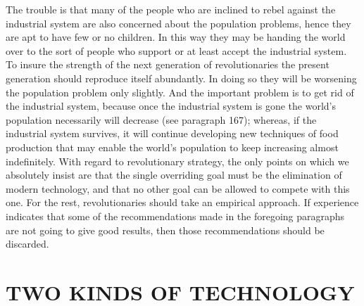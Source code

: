  The trouble is that many of the people who are inclined to rebel against the industrial system are also concerned about the population problems, hence they are apt to have few or no children. In this way they may be handing the world over to the sort of people who support or at least accept the industrial system. To insure the strength of the next generation of revolutionaries the present generation should reproduce itself abundantly. In doing so they will be worsening the population problem only slightly. And the important problem is to get rid of the industrial system, because once the industrial system is gone the world’s population necessarily will decrease (see paragraph 167); whereas, if the industrial system survives, it will continue developing new techniques of food production that may enable the world’s population to keep increasing almost indefinitely.\break
{} With regard to revolutionary strategy, the only points on which we absolutely insist are that the single overriding goal must be the elimination of modern technology, and that no other goal can be allowed to compete with this one. For the rest, revolutionaries should take an empirical approach. If experience indicates that some of the recommendations made in the foregoing paragraphs are not going to give good results, then those recommendations should be discarded.

\chapter{TWO KINDS OF TECHNOLOGY}

